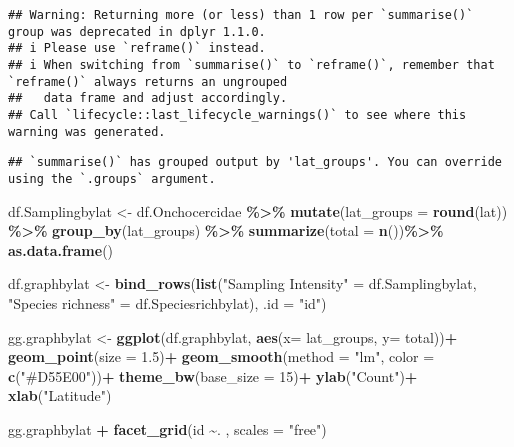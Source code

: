 \documentclass[
]{article}
\newenvironment{Shaded}{\begin{snugshade}}{\end{snugshade}}
\newcommand{\AttributeTok}[1]{\textcolor[rgb]{0.13,0.29,0.53}{#1}}
\newcommand{\DecValTok}[1]{\textcolor[rgb]{0.00,0.00,0.81}{#1}}
\newcommand{\FloatTok}[1]{\textcolor[rgb]{0.00,0.00,0.81}{#1}}
\newcommand{\FunctionTok}[1]{\textcolor[rgb]{0.13,0.29,0.53}{\textbf{#1}}}
\newcommand{\NormalTok}[1]{#1}
\newcommand{\OtherTok}[1]{\textcolor[rgb]{0.56,0.35,0.01}{#1}}
\newcommand{\SpecialCharTok}[1]{\textcolor[rgb]{0.81,0.36,0.00}{\textbf{#1}}}
\newcommand{\StringTok}[1]{\textcolor[rgb]{0.31,0.60,0.02}{#1}}
\begin{document}
\begin{verbatim}
## Warning: Returning more (or less) than 1 row per `summarise()` group was deprecated in dplyr 1.1.0.
## i Please use `reframe()` instead.
## i When switching from `summarise()` to `reframe()`, remember that `reframe()` always returns an ungrouped
##   data frame and adjust accordingly.
## Call `lifecycle::last_lifecycle_warnings()` to see where this warning was generated.
\end{verbatim}

\begin{verbatim}
## `summarise()` has grouped output by 'lat_groups'. You can override using the `.groups` argument.
\end{verbatim}

\begin{Shaded}
\begin{Highlighting}[]
\NormalTok{ df.Samplingbylat }\OtherTok{\textless{}{-}}\NormalTok{ df.Onchocercidae }\SpecialCharTok{\%\textgreater{}\%}
   \FunctionTok{mutate}\NormalTok{(}\AttributeTok{lat\_groups =} \FunctionTok{round}\NormalTok{(lat)) }\SpecialCharTok{\%\textgreater{}\%}
   \FunctionTok{group\_by}\NormalTok{(lat\_groups) }\SpecialCharTok{\%\textgreater{}\%}
   \FunctionTok{summarize}\NormalTok{(}\AttributeTok{total =} \FunctionTok{n}\NormalTok{())}\SpecialCharTok{\%\textgreater{}\%}
   \FunctionTok{as.data.frame}\NormalTok{()}

\NormalTok{ df.graphbylat }\OtherTok{\textless{}{-}} \FunctionTok{bind\_rows}\NormalTok{(}\FunctionTok{list}\NormalTok{(}\StringTok{"Sampling Intensity"} \OtherTok{=}\NormalTok{ df.Samplingbylat,  }\StringTok{"Species richness"} \OtherTok{=}\NormalTok{ df.Speciesrichbylat), }\AttributeTok{.id =} \StringTok{"id"}\NormalTok{)}
 
 
\NormalTok{ gg.graphbylat }\OtherTok{\textless{}{-}} \FunctionTok{ggplot}\NormalTok{(df.graphbylat, }\FunctionTok{aes}\NormalTok{(}\AttributeTok{x=}\NormalTok{ lat\_groups, }\AttributeTok{y=}\NormalTok{ total))}\SpecialCharTok{+}
   \FunctionTok{geom\_point}\NormalTok{(}\AttributeTok{size =} \FloatTok{1.5}\NormalTok{)}\SpecialCharTok{+}
   \FunctionTok{geom\_smooth}\NormalTok{(}\AttributeTok{method =} \StringTok{"lm"}\NormalTok{, }\AttributeTok{color =} \FunctionTok{c}\NormalTok{(}\StringTok{"\#D55E00"}\NormalTok{))}\SpecialCharTok{+}
    \FunctionTok{theme\_bw}\NormalTok{(}\AttributeTok{base\_size =} \DecValTok{15}\NormalTok{)}\SpecialCharTok{+}
    \FunctionTok{ylab}\NormalTok{(}\StringTok{"Count"}\NormalTok{)}\SpecialCharTok{+}
    \FunctionTok{xlab}\NormalTok{(}\StringTok{"Latitude"}\NormalTok{)}
  
\NormalTok{gg.graphbylat }\SpecialCharTok{+} \FunctionTok{facet\_grid}\NormalTok{(id }\SpecialCharTok{\textasciitilde{}}\NormalTok{. , }\AttributeTok{scales =} \StringTok{"free"}\NormalTok{)}
\end{Highlighting}
\end{Shaded}
\end{document}
